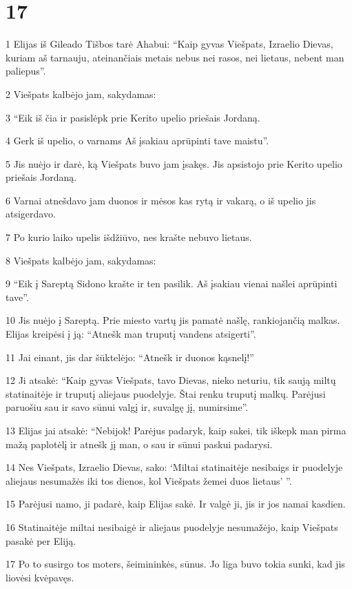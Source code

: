 \chapter{17}

\par 1 Elijas iš Gileado Tišbos tarė Ahabui: “Kaip gyvas Viešpats, Izraelio Dievas, kuriam aš tarnauju, ateinančiais metais nebus nei rasos, nei lietaus, nebent man paliepus”. 
\par 2 Viešpats kalbėjo jam, sakydamas: 
\par 3 “Eik iš čia ir pasislėpk prie Kerito upelio priešais Jordaną. 
\par 4 Gerk iš upelio, o varnams Aš įsakiau aprūpinti tave maistu”. 
\par 5 Jis nuėjo ir darė, ką Viešpats buvo jam įsakęs. Jis apsistojo prie Kerito upelio priešais Jordaną. 
\par 6 Varnai atnešdavo jam duonos ir mėsos kas rytą ir vakarą, o iš upelio jis atsigerdavo. 
\par 7 Po kurio laiko upelis išdžiūvo, nes krašte nebuvo lietaus. 
\par 8 Viešpats kalbėjo jam, sakydamas: 
\par 9 “Eik į Sareptą Sidono krašte ir ten pasilik. Aš įsakiau vienai našlei aprūpinti tave”. 
\par 10 Jis nuėjo į Sareptą. Prie miesto vartų jis pamatė našlę, rankiojančią malkas. Elijas kreipėsi į ją: “Atnešk man truputį vandens atsigerti”. 
\par 11 Jai einant, jis dar šūktelėjo: “Atnešk ir duonos kąsnelį!” 
\par 12 Ji atsakė: “Kaip gyvas Viešpats, tavo Dievas, nieko neturiu, tik saują miltų statinaitėje ir truputį aliejaus puodelyje. Štai renku truputį malkų. Parėjusi paruošiu sau ir savo sūnui valgį ir, suvalgę jį, numirsime”. 
\par 13 Elijas jai atsakė: “Nebijok! Parėjus padaryk, kaip sakei, tik iškepk man pirma mažą paplotėlį ir atnešk jį man, o sau ir sūnui paskui padarysi. 
\par 14 Nes Viešpats, Izraelio Dievas, sako: ‘Miltai statinaitėje nesibaigs ir puodelyje aliejaus nesumažės iki tos dienos, kol Viešpats žemei duos lietaus’ ”. 
\par 15 Parėjusi namo, ji padarė, kaip Elijas sakė. Ir valgė ji, jis ir jos namai kasdien. 
\par 16 Statinaitėje miltai nesibaigė ir aliejaus puodelyje nesumažėjo, kaip Viešpats pasakė per Eliją. 
\par 17 Po to susirgo tos moters, šeimininkės, sūnus. Jo liga buvo tokia sunki, kad jis liovėsi kvėpavęs. 
